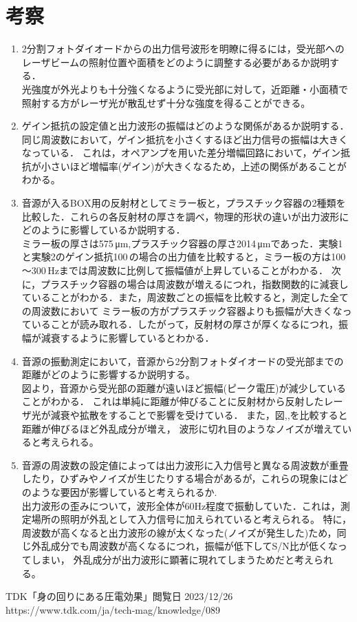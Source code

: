 \documentclass{ltjsarticle}
\begin{document}
\section{考察}
	\begin{enumerate}
		\item 2分割フォトダイオードからの出力信号波形を明瞭に得るには，受光部へのレーザビームの照射位置や面積をどのように調整する必要があるか説明する．\\
			光強度が外光よりも十分強くなるように受光部に対して，近距離・小面積で照射する方がレーザ光が散乱せず十分な強度を得ることができる。
		\item ゲイン抵抗の設定値と出力波形の振幅はどのような関係があるか説明する．\\
			同じ周波数において，ゲイン抵抗を小さくするほど出力信号の振幅は大きくなっている．
			これは，オペアンプを用いた差分増幅回路において，ゲイン抵抗が小さいほど増幅率(ゲイン)が大きくなるため，上述の関係があることがわかる。
		\item 音源が入るBOX用の反射材としてミラー板と，プラスチック容器の2種類を比較した．これらの各反射材の厚さを調べ，物理的形状の違いが出力波形にどのように影響しているか説明する．\\
			ミラー板の厚さは575\,μm,プラスチック容器の厚さ2014\,μmであった．実験1と実験2のゲイン抵抗100\,\Omega の場合の出力値を比較すると，ミラー板の方は100～300\,Hzまでは周波数に比例して振幅値が上昇していることがわかる．
			次に，プラスチック容器の場合は周波数が増えるにつれ，指数関数的に減衰していることがわかる．また，周波数ごとの振幅を比較すると，測定した全ての周波数において
			ミラー板の方がプラスチック容器よりも振幅が大きくなっていることが読み取れる．したがって，反射材の厚さが厚くなるにつれ，振幅が減衰するように影響しているとわかる．
		\item 音源の振動測定において，音源から2分割フォトダイオードの受光部までの距離がどのように影響するか説明する。\\
			図より，音源から受光部の距離が遠いほど振幅(ピーク電圧)が減少していることがわかる．
			これは単純に距離が伸びることに反射材から反射したレーザ光が減衰や拡散をすることで影響を受けている．
			また，図,,を比較すると距離が伸びるほど外乱成分が増え，
			波形に切れ目のようなノイズが増えていると考えられる。
		\item 音源の周波数の設定値によっては出力波形に入力信号と異なる周波数が重畳したり，ひずみやノイズが生じたりする場合があるが，これらの現象にはどのような要因が影響していると考えられるか.\\
			出力波形の歪みについて，波形全体が60Hz程度で振動していた．これは，測定場所の照明が外乱として入力信号に加えられていると考えられる。
			特に，周波数が高くなると出力波形の線が太くなった(ノイズが発生した)ため，同じ外乱成分でも周波数が高くなるにつれ，振幅が低下してS/N比が低くなってしまい，
			外乱成分が出力波形に顕著に現れてしまうためだと考えられる。
	\end{enumerate}
\begin{thebibliography}{99}
	TDK「身の回りにある圧電効果」閲覧日 2023/12/26\\
	https://www.tdk.com/ja/tech-mag/knowledge/089
\end{thebibliography}
\end{document}
